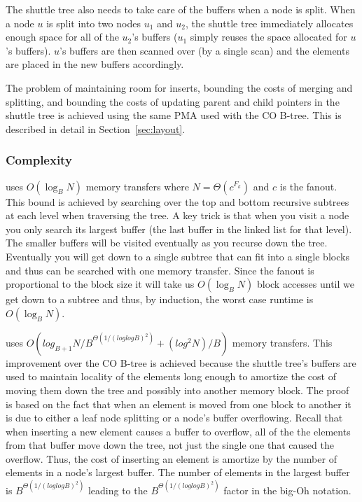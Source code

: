 \documentclass[preprint]{style}
\begin{document}
The shuttle tree also needs to take care of the buffers when a node is split.
When a node $u$ is split into two nodes $u_1$ and $u_2$, the shuttle tree
immediately allocates enough space for all of the $u_2$'s buffers ($u_1$ simply
reuses the space allocated for $u$'s buffers). $u$'s buffers are then scanned
over (by a single scan) and the elements are placed in the new buffers
accordingly.

The problem of maintaining room for inserts, bounding the costs of
merging and splitting, and bounding the costs of updating parent and child
pointers in the shuttle tree is achieved using the same PMA used with the CO
B-tree. This is described in detail in Section~\ref{sec:layout}.

\subsubsection{Complexity}

\Search{} uses $O(\log_{B}{N})$ memory transfers where $N = \Theta(c^{F_k})$ and
$c$ is the fanout. This bound is achieved by searching over the
top and bottom recursive subtrees at each level when traversing the tree. A
key trick is that when you visit a node you only search its largest buffer
(the last buffer in the linked list for that level). The smaller buffers will
be visited eventually as you recurse down the tree. Eventually you will get
down to a single subtree that can fit into a single blocks and thus can be
searched with one memory transfer. Since the fanout is proportional to the
block size it will take us $O(\log_B N)$ block accesses until we get down to a
subtree and thus, by induction, the worst case runtime is $O(\log_B N)$.



\Insert{} uses $O(log_{B+1} N / B^{\Theta(1/(loglogB)^2)} + (log^2 N) / B)$
memory transfers. This improvement over the CO B-tree is achieved because the
shuttle tree's buffers are used to maintain locality of the elements long
enough to amortize the cost of moving them down the tree and possibly into
another memory block. The proof is based on the fact that when an element is
moved from one block to another it is due to either a leaf node splitting or a
node's buffer overflowing. Recall that when inserting a new element causes a
buffer to overflow, all of the the elements from that buffer move down the
tree, not just the single one that caused the overflow. Thus, the cost of
inserting an element is amortize by the number of elements in a node's largest
buffer. The number of elements in the largest buffer is
$B^{\Theta(1/(loglogB)^2)}$ leading to the $B^{\Theta(1/(loglogB)^2)}$ factor
in the big-Oh notation.
\end{document}

